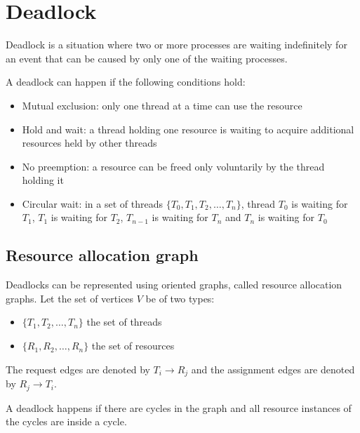 \section{Deadlock}
Deadlock is a situation where two or more processes are waiting indefinitely for an event that can be caused by only one of the waiting processes.

A deadlock can happen if the following conditions hold:
\begin{itemize}
    \item Mutual exclusion: only one thread at a time can use the resource
    \item Hold and wait: a thread holding one resource is waiting to acquire additional resources held by other threads
    \item No preemption: a resource can be freed only voluntarily by the thread holding it
    \item Circular wait: in a set of threads $\{T_0, T_1, T_2, \dots , T_n\}$, thread $T_0$ is waiting for $T_1$, $T_1$ is waiting for $T_2$, $T_{n-1}$ is waiting for $T_n$ and $T_n$ is waiting for $T_0$
\end{itemize}

\subsection{Resource allocation graph}
Deadlocks can be represented using oriented graphs, called resource allocation graphs. Let the set of vertices $V$ be of two types:
\begin{itemize}
    \item $\{T_1, T_2, \dots, T_n\}$ the set of threads
    \item $\{R_1, R_2, \dots, R_n\}$ the set of resources
\end{itemize}
The request edges are denoted by $T_i \rightarrow R_j$ and the assignment edges are denoted by $R_j \rightarrow T_i$.

A deadlock happens if there are cycles in the graph and all resource instances of the cycles are inside a cycle.


